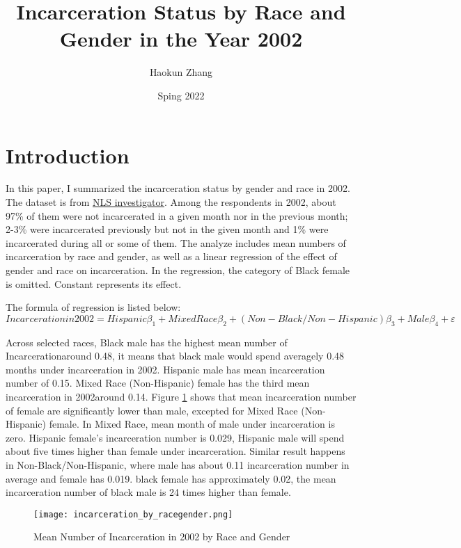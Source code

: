 \documentclass{article}
\author{Haokun Zhang}
\title{Incarceration Status by Race and Gender in the Year 2002}
\date{Sping 2022}
\begin{document}
\maketitle

\section{Introduction}

In this paper, I summarized the incarceration status by gender and race in 2002. The dataset is from \href{https://www.nlsinfo.org/investigator/pages/search}{NLS investigator}. Among the respondents in 2002, about 97\% of them were not incarcerated in a given month nor in the previous month; 2-3\% were incarcerated previously but not in the given month and 1\% were incarcerated during all or some of them. 
The analyze includes mean numbers of incarceration by race and gender, as well as a linear regression of the effect of gender and race on incarceration. In the regression, the category of Black female is omitted. Constant represents its effect.

The formula of regression is listed below:
$$
    Incarceration in 2002 = {Hispanic}\beta_1 +  {Mixed Race}\beta_2 + {(Non-Black/Non-Hispanic)}\beta_3 + {Male}\beta_4 + \varepsilon
$$

Across selected races, Black male has the highest mean number of Incarceration{\textemdash}around 0.48, it means that black male would spend averagely 0.48 months under incarceration in 2002. Hispanic male has mean incarceration number of 0.15. Mixed Race (Non-Hispanic) female has the third mean incarceration in 2002{\textemdash}around 0.14. 
Figure \ref{incarceration_by_racegender} shows that mean incarceration number of female are significantly lower than male, excepted for Mixed Race (Non-Hispanic) female. In Mixed Race, mean month of male under incarceration is zero. 
Hispanic female's incarceration number is 0.029, Hispanic male will spend about five times higher than female under incarceration. Similar result happens in Non-Black/Non-Hispanic, where male has about 0.11 incarceration number in average and female has 0.019. black female has approximately 0.02, the mean incarceration number of black male is 24 times higher than female. 

\begin{figure}[H]
    \begin{center}
        \texttt{[image: incarceration\_by\_racegender.png]}
    \end{center}
    \caption{Mean Number of Incarceration in 2002 by Race and Gender}
    \label{incarceration_by_racegender}
\end{figure}  
\end{document}
